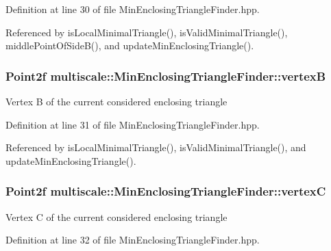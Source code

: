 Definition at line 30 of file Min\-Enclosing\-Triangle\-Finder.\-hpp.



Referenced by is\-Local\-Minimal\-Triangle(), is\-Valid\-Minimal\-Triangle(), middle\-Point\-Of\-Side\-B(), and update\-Min\-Enclosing\-Triangle().

\hypertarget{classmultiscale_1_1MinEnclosingTriangleFinder_a18e5ea5e0b341b3d02c4a75887f44c9c}{
\subsubsection[{vertex\-B}]{\setlength{\rightskip}{0pt plus 5cm}Point2f multiscale\-::\-Min\-Enclosing\-Triangle\-Finder\-::vertex\-B\hspace{0.3cm}{\ttfamily [private]}}}\label{classmultiscale_1_1MinEnclosingTriangleFinder_a18e5ea5e0b341b3d02c4a75887f44c9c}
Vertex B of the current considered enclosing triangle 

Definition at line 31 of file Min\-Enclosing\-Triangle\-Finder.\-hpp.



Referenced by is\-Local\-Minimal\-Triangle(), is\-Valid\-Minimal\-Triangle(), and update\-Min\-Enclosing\-Triangle().

\hypertarget{classmultiscale_1_1MinEnclosingTriangleFinder_a0fc6887251f73b19714f39888534cdaa}{
\subsubsection[{vertex\-C}]{\setlength{\rightskip}{0pt plus 5cm}Point2f multiscale\-::\-Min\-Enclosing\-Triangle\-Finder\-::vertex\-C\hspace{0.3cm}{\ttfamily [private]}}}\label{classmultiscale_1_1MinEnclosingTriangleFinder_a0fc6887251f73b19714f39888534cdaa}
Vertex C of the current considered enclosing triangle 

Definition at line 32 of file Min\-Enclosing\-Triangle\-Finder.\-hpp.



